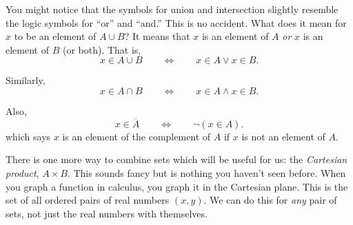 \documentclass[10pt,]{memoir}
\theoremstyle{plain}
\theoremstyle{definition}
\theoremstyle{definition}
\theoremstyle{definition}
\numberwithin{equation}{chapter}
\def\Iff{\Leftrightarrow}
\renewcommand{\bar}{\overline}
\begin{document}
      You might notice that the symbols for union and intersection slightly resemble the logic symbols for ``or'' and ``and.'' This is no accident. What does it mean for \(x\) to be an element of \(A\cup B\)? It means that \(x\) is an element of \(A\) \emph{or} \(x\) is an element of \(B\) (or both). That is,
      \begin{equation*}
        x \in A \cup B \qquad \Iff \qquad x \in A \vee x \in B.
      \end{equation*}
\par

      Similarly,
      \begin{equation*}
        x \in A \cap B \qquad \Iff \qquad x \in A \wedge x \in B.
      \end{equation*}
\par

      Also,
      \begin{equation*}
        x \in \bar A \qquad \Iff \qquad \neg (x \in A).
      \end{equation*}
      which says \(x\) is an element of the complement of \(A\) if \(x\) is not an element of \(A\).
\par

      There is one more way to combine sets which will be useful for us: the \emph{Cartesian product}, \(A \times B\). This sounds fancy but is nothing you haven't seen before. When you graph a function in calculus, you graph it in the Cartesian plane. This is the set of all ordered pairs of real numbers \((x,y)\). We can do this for \emph{any} pair of sets, not just the real numbers with themselves.
\par
\end{document}
